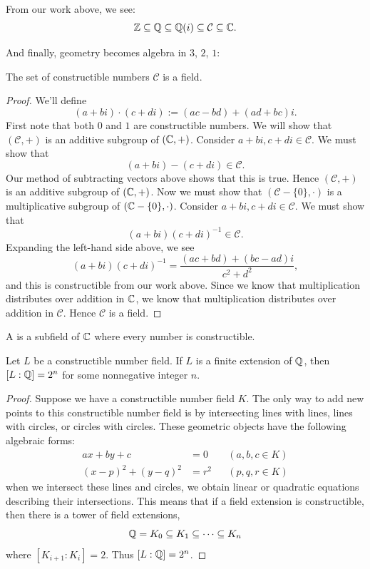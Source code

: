 \documentclass{ximera}
\begin{document}
From our work above, we see:
\[
\mathbb Z\subseteq \mathbb Q \subseteq \mathbb Q(i) \subseteq \mathcal{C} \subseteq \mathbb C.
\]

And finally, geometry becomes algebra in $3$, $2$, $1$:

\begin{lemma}
  The set of constructible numbers $\mathcal{C}$ is a field.
  \begin{proof}
    We'll define
    \[
    (a+ bi)\cdot(c+di) := (ac-bd) + (ad+bc)i.
    \]
    First note that both $0$ and $1$ are constructible numbers. We
    will show that $(\mathcal{C},+)$ is an additive subgroup of
    $(\mathbb C,+)$. Consider $a+ bi, c+di \in \mathcal{C}$. We must show
    that
    \[
    (a+ bi)-(c+di)\in \mathcal{C}.
    \]
    Our method of subtracting vectors above shows that this is
    true. Hence $(\mathcal{C},+)$ is an additive subgroup of
    $(\mathbb C,+)$. Now we must show that $(\mathcal{C}-\{0\},\cdot)$ is a
    multiplicative subgroup of $(\mathbb C-\{0\},\cdot)$. Consider $a+ bi,
    c+di \in \mathcal{C}$. We must show that
    \[
    (a+ bi)(c+di)^{-1} \in \mathcal{C}.
    \]
    Expanding the left-hand side above, we see
    \[
    (a+ bi)(c+di)^{-1} = \frac{(ac+bd) + (bc-ad)i}{c^2 + d^2},
    \]
    and this is constructible from our work above. Since we know that
    multiplication distributes over addition in $\mathbb C$, we know that
    multiplication distributes over addition in $\mathcal{C}$. Hence
    $\mathcal{C}$ is a field.
  \end{proof}
\end{lemma}


\begin{definition}
  A  is a subfield of $\mathbb C$ where every
  number is constructible.
\end{definition}

\begin{theorem}\label{T:dc}
  Let $L$ be a constructible number field. If $L$ is a finite
  extension of $\mathbb Q$, then $[L: \mathbb Q] = 2^n$ for some nonnegative integer
  $n$.
  \begin{proof}
    Suppose we have a constructible number field $K$. The only way to
    add new points to this constructible number field is by
    intersecting lines with lines, lines with circles, or circles with
    circles. These geometric objects have the following algebraic
    forms:
    \begin{align*}
      ax + by + c &= 0 & & (a,b,c\in K)\\
      (x-p)^2 + (y-q)^2 &= r^2 & & (p,q,r\in K)
    \end{align*}
    when we intersect these lines and circles, we obtain linear or
    quadratic equations describing their intersections. This means
    that if a field extension is constructible, then there is a tower
    of field extensions,
    \[
    \mathbb Q = K_0 \subseteq K_1 \subseteq \cdots \subseteq K_n
    \]
    where $[K_{i+1}:K_i] = 2$. Thus $[L:\mathbb Q]=2^n$.
  \end{proof}
\end{theorem}
\end{document}
